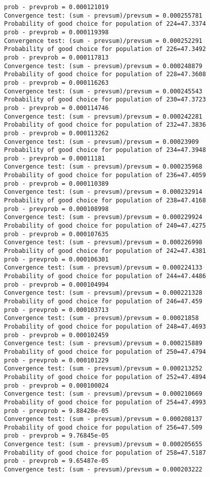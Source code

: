 \documentclass[11pt,onecolumn]{article}
\begin{document}
\begin{verbatim}
prob - prevprob = 0.000121019
Convergence test: (sum - prevsum)/prevsum = 0.000255781
Probability of good choice for population of 224=47.3374
prob - prevprob = 0.000119398
Convergence test: (sum - prevsum)/prevsum = 0.000252291
Probability of good choice for population of 226=47.3492
prob - prevprob = 0.000117813
Convergence test: (sum - prevsum)/prevsum = 0.000248879
Probability of good choice for population of 228=47.3608
prob - prevprob = 0.000116263
Convergence test: (sum - prevsum)/prevsum = 0.000245543
Probability of good choice for population of 230=47.3723
prob - prevprob = 0.000114746
Convergence test: (sum - prevsum)/prevsum = 0.000242281
Probability of good choice for population of 232=47.3836
prob - prevprob = 0.000113262
Convergence test: (sum - prevsum)/prevsum = 0.00023909
Probability of good choice for population of 234=47.3948
prob - prevprob = 0.00011181
Convergence test: (sum - prevsum)/prevsum = 0.000235968
Probability of good choice for population of 236=47.4059
prob - prevprob = 0.000110389
Convergence test: (sum - prevsum)/prevsum = 0.000232914
Probability of good choice for population of 238=47.4168
prob - prevprob = 0.000108998
Convergence test: (sum - prevsum)/prevsum = 0.000229924
Probability of good choice for population of 240=47.4275
prob - prevprob = 0.000107635
Convergence test: (sum - prevsum)/prevsum = 0.000226998
Probability of good choice for population of 242=47.4381
prob - prevprob = 0.000106301
Convergence test: (sum - prevsum)/prevsum = 0.000224133
Probability of good choice for population of 244=47.4486
prob - prevprob = 0.000104994
Convergence test: (sum - prevsum)/prevsum = 0.000221328
Probability of good choice for population of 246=47.459
prob - prevprob = 0.000103713
Convergence test: (sum - prevsum)/prevsum = 0.00021858
Probability of good choice for population of 248=47.4693
prob - prevprob = 0.000102459
Convergence test: (sum - prevsum)/prevsum = 0.000215889
Probability of good choice for population of 250=47.4794
prob - prevprob = 0.000101229
Convergence test: (sum - prevsum)/prevsum = 0.000213252
Probability of good choice for population of 252=47.4894
prob - prevprob = 0.000100024
Convergence test: (sum - prevsum)/prevsum = 0.000210669
Probability of good choice for population of 254=47.4993
prob - prevprob = 9.88428e-05
Convergence test: (sum - prevsum)/prevsum = 0.000208137
Probability of good choice for population of 256=47.509
prob - prevprob = 9.76845e-05
Convergence test: (sum - prevsum)/prevsum = 0.000205655
Probability of good choice for population of 258=47.5187
prob - prevprob = 9.65487e-05
Convergence test: (sum - prevsum)/prevsum = 0.000203222

\end{verbatim}
\end{document}
